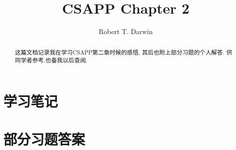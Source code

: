 \documentclass[ a4paper, 10pt ]{article}
\begin{document}
\title{CSAPP Chapter 2}
\author{Robert T. Darwin}
\maketitle
\begin{abstract}
	这篇文档记录我在学习CSAPP第二章时候的感悟, 
	其后也附上部分习题的个人解答. 
	供同学者参考,也备我以后查阅.
\end{abstract}
\tableofcontents
\newpage

\section{学习笔记}

\section{部分习题答案}
\end{document}
